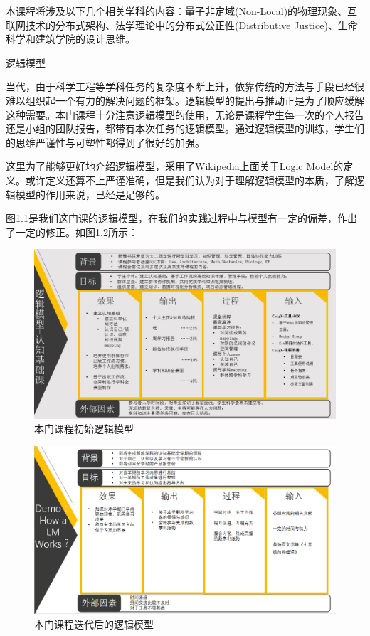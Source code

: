 \documentclass[11pt,fleqn]{book}
\makeatletter
\numberwithin{dummy}{section}
\theoremstyle{ocrenumbox}
\theoremstyle{blacknumex}
\theoremstyle{blacknumbox}
\theoremstyle{ocrenum}
\renewcommand{\section}{\@startsection{section}{1}{\z@}
	{-4ex \@plus -1ex \@minus -.4ex}
	{1ex \@plus.2ex }
	{\normalfont\large\sffamily\bfseries}}
\makeatother
\begin{document}
本课程将涉及以下几个相关学科的内容：量子非定域(Non-Local)的物理现象、互联网技术的分布式架构、法学理论中的分布式公正性(Distributive Justice)、生命科学和建筑学院的设计思维。

\section{逻辑模型}

当代，由于科学工程等学科任务的复杂度不断上升，依靠传统的方法与手段已经很难以组织起一个有力的解决问题的框架。逻辑模型的提出与推动正是为了顺应缓解这种需要。本门课程十分注意逻辑模型的使用，无论是课程学生每一次的个人报告还是小组的团队报告，都带有本次任务的逻辑模型。通过逻辑模型的训练，学生们的思维严谨性与可塑性都得到了很好的加强。

这里为了能够更好地介绍逻辑模型，采用了Wikipedia上面关于Logic Model的定义。或许定义还算不上严谨准确，但是我们认为对于理解逻辑模型的本质，了解逻辑模型的作用来说，已经是足够的。

图1.1是我们这门课的逻辑模型，在我们的实践过程中与模型有一定的偏差，作出了一定的修正。如图1.2所示：

\begin{figure}[h]
	\centering\includegraphics[width=15cm]{1.jpg}
	\caption{本门课程初始逻辑模型}
\end{figure}

\begin{figure}[h]
	\centering\includegraphics[width=15cm]{12.png}
	\caption{本门课程迭代后的逻辑模型}
\end{figure}
\end{document}
